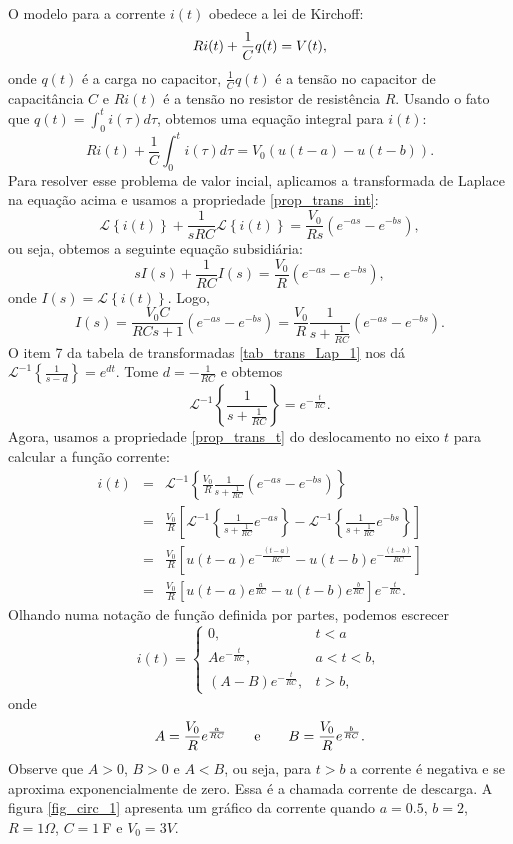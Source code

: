 O modelo para a corrente $i(t)$ obedece a lei de Kirchoff:
\begin{equation}{\label{modelo_corrente_0}}
 Ri(t)+\frac{1}{C}q(t)=V(t),
\end{equation}
onde $q(t)$ é a carga no capacitor, $\frac{1}{C}q(t)$ é a tensão no capacitor de capacitância $C$ e $Ri(t)$ é a tensão no resistor de resistência $R$. Usando o fato que $q(t)=\int_0^t i(\tau)d\tau$, obtemos uma equação integral para $i(t)$:
$$
Ri(t)+\frac{1}{C}\int_0^t i(\tau)d\tau=V_0\left(u(t-a)-u(t-b)\right).
$$
Para resolver esse problema de valor incial, aplicamos a transformada de Laplace na equação acima e usamos a propriedade \ref{prop_trans_int}:
$$
\mathcal{L}\left\{i(t)\right\}+\frac{1}{sRC}\mathcal{L}\left\{i(t)\right\}=\frac{V_0}{Rs}\left(e^{-as}-e^{-bs}\right),
$$
ou seja, obtemos a seguinte equação subsidiária:
$$
sI(s)+\frac{1}{RC}I(s)=\frac{V_0}{R}\left(e^{-as}-e^{-bs}\right),
$$
onde $I(s)=\mathcal{L}\left\{i(t)\right\}$. Logo,
$$
I(s)=\frac{V_0 C}{RCs+1}\left(e^{-as}-e^{-bs}\right)=\frac{V_0}{R}\frac{1}{s+\frac{1}{RC}}\left(e^{-as}-e^{-bs}\right).
$$
O item 7 da tabela de transformadas \ref{tab_trans_Lap_1} nos dá $\mathcal{L}^{-1}\left\{\frac{1}{s-d}\right\}=e^{dt}$. Tome $d=-\frac{1}{RC}$ e obtemos
$$
\mathcal{L}^{-1}\left\{\frac{1}{s+\frac{1}{RC}}\right\}=e^{-\frac{t}{RC}}.
$$
Agora, usamos a propriedade \ref{prop_trans_t} do deslocamento no eixo $t$ para calcular a função corrente:
\begin{eqnarray*}
i(t)&=&\mathcal{L}^{-1}\left\{\frac{V_0}{R}\frac{1}{s+\frac{1}{RC}}\left(e^{-as}-e^{-bs}\right)\right\}\\
&=&\frac{V_0}{R}\left[\mathcal{L}^{-1}\left\{\frac{1}{s+\frac{1}{RC}}e^{-as}\right\}-\mathcal{L}^{-1}\left\{\frac{1}{s+\frac{1}{RC}}e^{-bs}\right\}\right]\\
&=&\frac{V_0}{R}\left[u(t-a)e^{-\frac{(t-a)}{RC}}-u(t-b)e^{-\frac{(t-b)}{RC}}\right]\\
&=&\frac{V_0}{R}\left[u(t-a)e^{\frac{a}{RC}}-u(t-b)e^{\frac{b}{RC}}\right]e^{-\frac{t}{RC}}.
\end{eqnarray*}
Olhando numa notação de função definida por partes, podemos escrecer
$$
i(t)=\left\{\begin{array}{ll}0,&t<a  \\A e^{-\frac{t}{RC}}, &a<t<b, \\ \left(A-B\right)e^{-\frac{t}{RC}}, &t>b, \end{array}\right.
$$
onde
$$
A=\frac{V_0}{R}e^{\frac{a}{RC}}\qquad\hbox{e}\qquad B=\frac{V_0}{R}e^{\frac{b}{RC}}.
$$
Observe que $A>0$, $B>0$ e $A<B$, ou seja, para $t>b$ a corrente é negativa e se aproxima exponencialmente de zero. Essa é a chamada corrente de descarga. A figura \ref{fig_circ_1} apresenta um gráfico da corrente quando $a=0.5$, $b=2$, $R=1\Omega$, $C=1\ \!$F e $V_0=3V$.
